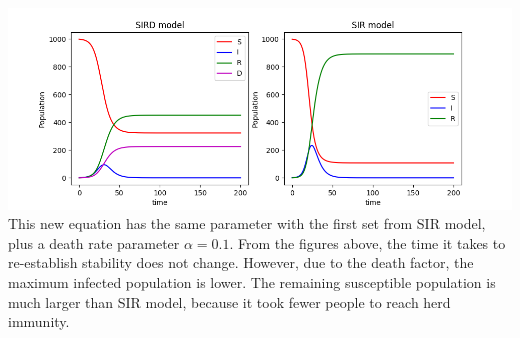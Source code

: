 \documentclass{article}
\begin{document}
\includegraphics[scale=0.5]{Question_3(b).png}
This new equation has the same parameter with the first set from SIR model, plus a death rate parameter $\alpha=0.1$. From the figures above, the time it takes to re-establish stability does not change. However, due to the death factor, the maximum infected population is lower. The remaining susceptible population is much larger than SIR model, because it took fewer people to reach herd immunity.
\end{document}
